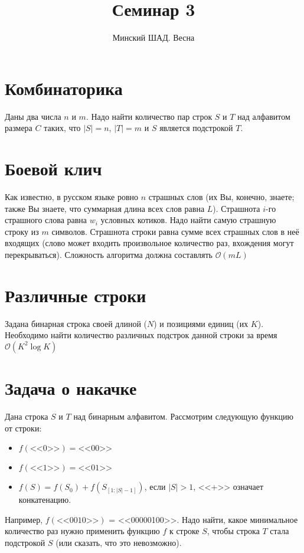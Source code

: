\documentclass[addpoints]{exam}
\title{Семинар 3}
\author{Минский ШАД. Весна}
\begin{document}
\maketitle

\section{Комбинаторика}

Даны два числа $n$ и $m$. Надо найти количество пар строк $S$ и $T$ над алфавитом размера $C$ таких, что $|S| = n$, $|T| = m$ и $S$ является подстрокой $T$.

\section{Боевой клич}

Как известно, в русском языке ровно $n$ страшных слов (их Вы, конечно, знаете; также Вы знаете, что суммарная длина всех слов равна $L$). Страшнота $i$-го страшного слова равна $w_i$ условных котиков. Надо найти самую страшную строку из $m$ символов. Страшнота строки равна сумме всех страшных слов в неё входящих (слово может входить произвольное количество раз, вхождения могут перекрываться). Сложность алгоритма должна составлять $\mathcal{O}(mL)$

\section{Различные строки}

Задана бинарная строка своей длиной ($N$) и позициями единиц (их $K$). Необходимо найти количество различных подстрок данной строки за время $\mathcal{O}(K^2 \log{K})$

\section{Задача о накачке}

Дана строка $S$ и $T$ над бинарным алфавитом. Рассмотрим следующую функцию от строки:

\begin{itemize}
\item $f(\mbox{<<0>>}) = \mbox{<<00>>}$
\item $f(\mbox{<<1>>}) = \mbox{<<01>>}$
\item $f(S) = f(S_0) + f(S_{[1:|S| - 1]})$, если $|S| > 1$, <<+>> означает конкатенацию.
\end{itemize}

Например, $f(\mbox{<<0010>>})$ = <<00000100>>. Надо найти, какое минимальное количество раз нужно применить функцию $f$ к строке $S$, чтобы строка $T$ стала подстрокой $S$ (или сказать, что это невозможно).
\end{document}

